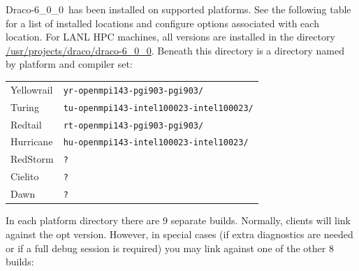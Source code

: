 \documentclass[note]{ResearchNote}
\newcommand{\draco}{Draco}
\newcommand{\dracor}{\draco-6\_0\_0}
\begin{document}
\dracor\ has been installed on supported platforms.  See the following
table for a list of installed locations and configure options
associated with each location.  For LANL HPC machines, all versions
are installed in the directory \url{/usr/projects/draco/draco-6_0_0}.
Beneath this directory is a directory named by platform and compiler
set:
%
\begin{center}
  \footnotesize
  \begin{tabular}{lp{2.5in}}
    \hline\hline
    \textsf{Yellowrail} & \texttt{yr-openmpi143-pgi903-pgi903/}  \\
    \textsf{Turing}     & \texttt{tu-openmpi143-intel100023-intel100023/}  \\
    \textsf{Redtail}    & \texttt{rt-openmpi143-pgi903-pgi903/}  \\
    \textsf{Hurricane}  & \texttt{hu-openmpi143-intel100023-intel10023/}  \\
    \textsf{RedStorm }  & \texttt{?}  \\
    \textsf{Cielito}    & \texttt{?}  \\
    \textsf{Dawn}       & \texttt{?}  \\
    \hline\hline
  \end{tabular}
\end{center}
%
In each platform directory there are 9 separate builds.  Normally,
clients will link against the \textsf{opt} version.  However, in
special cases (if extra diagnostics are needed or if a full debug
session is required) you may link against one of the other 8 builds:
%
\end{document}

